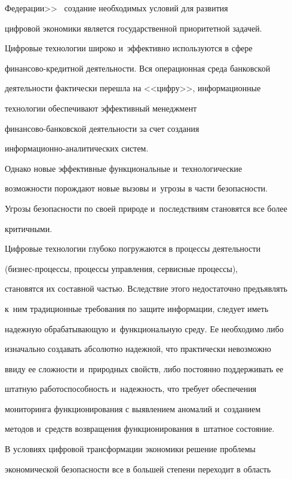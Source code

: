 Федерации>>~\cite{10-zk} создание необходимых условий для развития 

цифровой экономики является государственной приоритетной задачей. 

  

  Цифровые технологии широко и~эффективно используются в сфере 

фи\-нан\-со\-во-кре\-дит\-ной деятельности. Вся операционная среда банковской 

деятельности фактически перешла на <<циф\-ру>>, информационные 

технологии обеспечивают эффективный менеджмент  

фи\-нан\-со\-во-бан\-ков\-ской деятельности за счет создания  

ин\-фор\-ма\-ци\-он\-но-ана\-ли\-ти\-че\-ских систем.


  Однако новые эффективные функциональные и~технологические 

возможности порождают новые вызовы и~угрозы в части безопасности. 

Угрозы без\-опас\-ности по своей природе и~последствиям становятся все более 

критичными.

  

  Цифровые технологии глубоко погружаются в процессы деятельности 

(биз\-нес-про\-цес\-сы, процессы управления, сервисные процессы), 

становятся их составной частью. Вследствие этого недостаточно предъявлять 

к~ним традиционные требования по защите информации, следует иметь 

надежную обрабатывающую и~функциональную среду. Ее необходимо либо 

изначально создавать абсолютно надежной, что практически невозможно 

ввиду ее сложности и~природных свойств, либо постоянно поддерживать ее 

штатную работоспособность и~надежность, что требует обеспечения 

мониторинга функционирования с выявлением аномалий и~созданием 

методов и~средств возвращения функционирования в~штатное состояние. 

  

  В условиях цифровой трансформации экономики решение проблемы 

экономической безопасности все в большей степени переходит в область 

